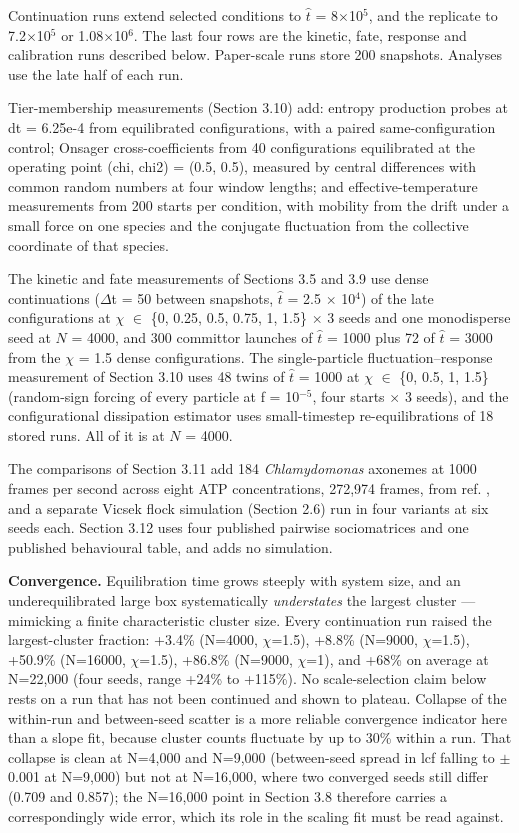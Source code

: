 \documentclass[aps,pre,preprint,superscriptaddress,nofootinbib,longbibliography]{revtex4-2}
\begin{document}
Continuation runs extend selected conditions to $\hat{t}$ = 8$\times$10$^{5}$, and the replicate to 7.2$\times$10$^{5}$ or 1.08$\times$10$^{6}$. The last four rows are the kinetic, fate, response and calibration runs described below. Paper-scale runs store 200 snapshots. Analyses use the late half of each run.

Tier-membership measurements (Section 3.10) add: entropy production probes at dt = 6.25e-4 from equilibrated configurations, with a paired same-configuration control; Onsager cross-coefficients from 40 configurations equilibrated at the operating point (chi, chi2) = (0.5, 0.5), measured by central differences with common random numbers at four window lengths; and effective-temperature measurements from 200 starts per condition, with mobility from the drift under a small force on one species and the conjugate fluctuation from the collective coordinate of that species.

The kinetic and fate measurements of Sections 3.5 and 3.9 use dense continuations ($\Delta$t = 50 between snapshots, $\hat{t}$ = 2.5 $\times$ 10$^{4}$) of the late configurations at $\chi$ $\in$ \{0, 0.25, 0.5, 0.75, 1, 1.5\} $\times$ 3 seeds and one monodisperse seed at $N$ = 4000, and 300 committor launches of $\hat{t}$ = 1000 plus 72 of $\hat{t}$ = 3000 from the $\chi$ = 1.5 dense configurations. The single-particle fluctuation--response measurement of Section 3.10 uses 48 twins of $\hat{t}$ = 1000 at $\chi$ $\in$ \{0, 0.5, 1, 1.5\} (random-sign forcing of every particle at f = 10$^{-5}$, four starts $\times$ 3 seeds), and the configurational dissipation estimator uses small-timestep re-equilibrations of 18 stored runs. All of it is at $N$ = 4000.

The comparisons of Section 3.11 add 184 \emph{Chlamydomonas} axonemes at 1000 frames per second across eight ATP concentrations, 272,974 frames, from ref. \cite{r6}, and a separate Vicsek flock simulation (Section 2.6) run in four variants at six seeds each. Section 3.12 uses four published pairwise sociomatrices and one published behavioural table, and adds no simulation.

\textbf{Convergence.} Equilibration time grows steeply with system size, and an underequilibrated large box systematically \emph{understates} the largest cluster --- mimicking a finite characteristic cluster size. Every continuation run raised the largest-cluster fraction: +3.4\% (N=4000, $\chi$=1.5), +8.8\% (N=9000, $\chi$=1.5), +50.9\% (N=16000, $\chi$=1.5), +86.8\% (N=9000, $\chi$=1), and +68\% on average at N=22,000 (four seeds, range +24\% to +115\%). No scale-selection claim below rests on a run that has not been continued and shown to plateau. Collapse of the within-run and between-seed scatter is a more reliable convergence indicator here than a slope fit, because cluster counts fluctuate by up to 30\% within a run. That collapse is clean at N=4,000 and N=9,000 (between-seed spread in lcf falling to $\pm$0.001 at N=9,000) but not at N=16,000, where two converged seeds still differ (0.709 and 0.857); the N=16,000 point in Section 3.8 therefore carries a correspondingly wide error, which its role in the scaling fit must be read against.
\end{document}
